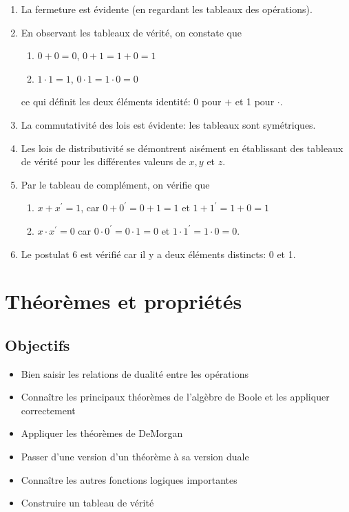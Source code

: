 \documentclass[letter, oneside]{book}
\begin{document}
\begin{enumerate}
\item La fermeture est évidente (en regardant les tableaux des opérations).

\item En observant les tableaux de vérité, on constate que

\begin{enumerate}
\item \(0 + 0 = 0\), \(0 + 1 = 1 + 0 = 1\)

\item \(1 \cdot 1 = 1\), \(0 \cdot 1 = 1 \cdot 0 = 0\)
\end{enumerate}

ce qui définit les deux éléments identité: 0 pour \(+\) et 1 pour  \(\cdot\).

\item La commutativité des lois est évidente: les tableaux sont
symétriques.

\item Les lois de distributivité se démontrent aisément en établissant des
tableaux de vérité pour les différentes valeurs de \(x, y\) et \(z\).

\item Par le tableau de complément, on vérifie que

\begin{enumerate}
\item \(x + x^{\prime} = 1\), car \(0 + 0^{\prime} = 0 + 1 = 1\) et \(1 +
        1^{\prime} = 1+ 0 = 1\)

\item \(x \cdot x^{\prime} = 0\) car \(0 \cdot 0^{\prime} = 0 \cdot 1 =
        0\) et \(1 \cdot 1^{\prime} = 1 \cdot 0 = 0\).
\end{enumerate}

\item Le postulat 6 est vérifié car il y a deux éléments distincts: 0 et 1.
\end{enumerate}

\chapter{Théorèmes et propriétés}
\label{sec:org877eeb0}
\section{Objectifs}
\label{sec:org0854bab}
\begin{itemize}
\item Bien saisir les relations de dualité entre les opérations
\item Connaître les principaux théorèmes de l'algèbre de Boole et
les appliquer correctement
\item Appliquer les théorèmes de DeMorgan
\item Passer d'une version d'un théorème à sa version duale
\item Connaître les autres fonctions logiques importantes
\item Construire un tableau de vérité
\end{itemize}
\end{document}
